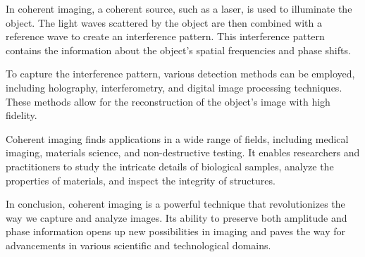 \documentclass[12pt, a4paper, twocolumn]{article}
\begin{document}
In coherent imaging, a coherent source, such as a laser, is used to illuminate the object. The light waves scattered by the object are then combined with a reference wave to create an interference pattern. This interference pattern contains the information about the object's spatial frequencies and phase shifts.

To capture the interference pattern, various detection methods can be employed, including holography, interferometry, and digital image processing techniques. These methods allow for the reconstruction of the object's image with high fidelity.

Coherent imaging finds applications in a wide range of fields, including medical imaging, materials science, and non-destructive testing. It enables researchers and practitioners to study the intricate details of biological samples, analyze the properties of materials, and inspect the integrity of structures.

In conclusion, coherent imaging is a powerful technique that revolutionizes the way we capture and analyze images. Its ability to preserve both amplitude and phase information opens up new possibilities in imaging and paves the way for advancements in various scientific and technological domains.
\end{document}
